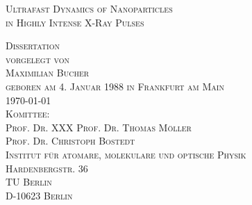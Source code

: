 

\begin{titlepage}

\begin{center}

\vspace*{1cm}
\LARGE
\textsc{Ultrafast Dynamics of Nanoparticles\\in Highly Intense X-Ray Pulses}\\

\vspace{2cm}

\Large
\textsc{Dissertation\\[0.5\baselineskip]
vorgelegt von\\[0.5\baselineskip]
Maximilian Bucher\\
{\normalsize \textsc{geboren am 4. Januar 1988 in Frankfurt am Main}}}\\

\large
\vspace{2.0cm}
\textsc{\today}\\ %

\vspace{1cm}
\textsc{Komittee:\\
Prof. Dr. XXX
Prof. Dr. Thomas M\"oller\\
Prof. Dr. Christoph Bostedt}\\

\vspace{1cm}
\textsc{Institut f\"{u}r atomare, molekulare und optische Physik\\
Hardenbergstr. 36\\
TU Berlin\\
D-10623 Berlin}\\
\end{center}
\end{titlepage}